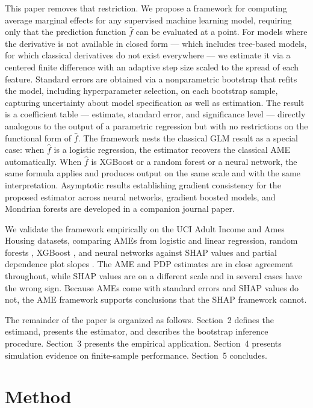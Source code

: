 \documentclass[conference]{IEEEtran}
\begin{document}
	This paper removes that restriction. We propose a framework for computing average marginal effects for any supervised machine learning model, requiring only that the prediction function $\hat{f}$ can be evaluated at a point. For models where the derivative is not available in closed form --- which includes tree-based models, for which classical derivatives do not exist everywhere --- we estimate it via a centered finite difference with an adaptive step size scaled to the spread of each feature. Standard errors are obtained via a nonparametric bootstrap \cite{efron1979, efrontibshirani1993} that refits the model, including hyperparameter selection, on each bootstrap sample, capturing uncertainty about model specification as well as estimation. The result is a coefficient table --- estimate, standard error, and significance level --- directly analogous to the output of a parametric regression but with no restrictions on the functional form of $\hat{f}$. The framework nests the classical GLM result as a special case: when $\hat{f}$ is a logistic regression, the estimator recovers the classical AME automatically. When $\hat{f}$ is XGBoost or a random forest or a neural network, the same formula applies and produces output on the same scale and with the same interpretation. Asymptotic results establishing gradient consistency for the proposed estimator across neural networks, gradient boosted models, and Mondrian forests are developed in a companion journal paper.
	
	We validate the framework empirically on the UCI Adult Income \cite{kohavi1996, UCI} and Ames Housing \cite{decock2011} datasets, comparing AMEs from logistic and linear regression, random forests \cite{breiman2001rf}, XGBoost \cite{chen2016xgboost}, and neural networks against SHAP values \cite{lundberg2017shap} and partial dependence plot slopes \cite{friedman2001pdp}. The AME and PDP estimates are in close agreement throughout, while SHAP values are on a different scale and in several cases have the wrong sign. Because AMEs come with standard errors and SHAP values do not, the AME framework supports conclusions that the SHAP framework cannot.
	
	The remainder of the paper is organized as follows. Section~2 defines the estimand, presents the estimator, and describes the bootstrap inference procedure. Section~3 presents the empirical application. Section~4 presents simulation evidence on finite-sample performance. Section~5 concludes.
	
	\section{Method}
	
\end{document}
